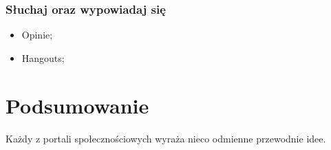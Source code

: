 \subsubsection{Słuchaj oraz wypowiadaj się}

\begin{itemize}
\item Opinie;
\item Hangouts;
\end{itemize}

\clearpage
\section{Podsumowanie}

Każdy z portali społecznościowych wyraża nieco odmienne przewodnie idee. 
